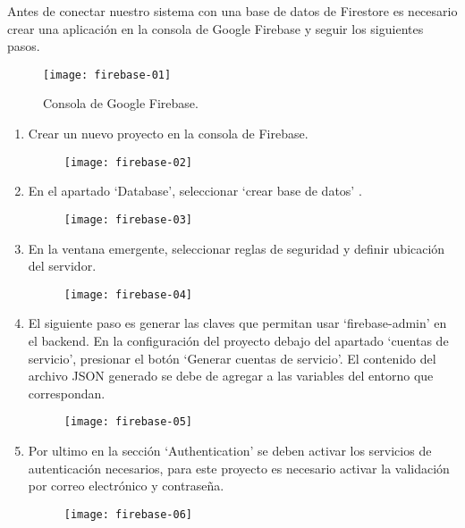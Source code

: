 Antes de conectar nuestro sistema con una base de datos de Firestore es necesario crear una aplicación en la consola de Google Firebase y seguir los siguientes pasos.
\vspace{0.8cm}

\begin{figure}[H]
  \centering
  \texttt{[image: firebase-01]}
  \caption{Consola de Google Firebase.}
\end{figure}

\begin{enumerate}
  \item Crear un nuevo proyecto en la consola de Firebase.

  \begin{figure}[H]
    \centering
    \texttt{[image: firebase-02]}
  \end{figure}

  \item En el apartado `Database', seleccionar `crear base de datos' .

  \begin{figure}[H]
    \centering
    \texttt{[image: firebase-03]}
  \end{figure}

  \item En la ventana emergente, seleccionar reglas de seguridad y definir ubicación del servidor.

  \begin{figure}[H]
    \centering
    \texttt{[image: firebase-04]}
  \end{figure}

  \item El siguiente paso es generar las claves que permitan usar `firebase-admin' en el \gls{backend}. En la configuración del proyecto debajo del apartado `cuentas de servicio', presionar el botón `Generar cuentas de servicio'. El contenido del archivo JSON generado se debe de agregar a las variables del entorno que correspondan.

  \begin{figure}[H]
    \centering
    \texttt{[image: firebase-05]}
  \end{figure}

  \item Por ultimo en la sección `Authentication' se deben activar los servicios de autenticación necesarios, para este proyecto es necesario activar la validación por correo electrónico y contraseña.

  \begin{figure}[H]
    \centering
    \texttt{[image: firebase-06]}
  \end{figure}
\end{enumerate}

